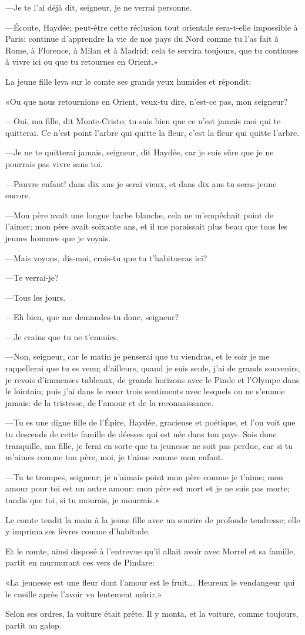 —Je te l'ai déjà dit, seigneur, je ne verrai personne. 

—Écoute, Haydée; peut-être cette réclusion tout orientale sera-t-elle impossible à Paris: continue d'apprendre la vie de nos pays du Nord comme tu l'as fait à Rome, à Florence, à Milan et à Madrid; cela te servira toujours, que tu continues à vivre ici ou que tu retournes en Orient.» 

La jeune fille leva sur le comte ses grands yeux humides et répondit: 

«Ou que nous retournions en Orient, veux-tu dire, n'est-ce pas, mon seigneur? 

—Oui, ma fille, dit Monte-Cristo; tu sais bien que ce n'est jamais moi qui te quitterai. Ce n'est point l'arbre qui quitte la fleur, c'est la fleur qui quitte l'arbre. 

—Je ne te quitterai jamais, seigneur, dit Haydée, car je suis sûre que je ne pourrais pas vivre sans toi. 

—Pauvre enfant! dans dix ans je serai vieux, et dans dix ans tu seras jeune encore. 

—Mon père avait une longue barbe blanche, cela ne m'empêchait point de l'aimer; mon père avait soixante ans, et il me paraissait plus beau que tous les jeunes hommes que je voyais. 

—Mais voyons, dis-moi, crois-tu que tu t'habitueras ici? 

—Te verrai-je? 

—Tous les jours. 

—Eh bien, que me demandes-tu donc, seigneur? 

—Je crains que tu ne t'ennuies. 

—Non, seigneur, car le matin je penserai que tu viendras, et le soir je me rappellerai que tu es venu; d'ailleurs, quand je suis seule, j'ai de grands souvenirs, je revois d'immenses tableaux, de grands horizons avec le Pinde et l'Olympe dans le lointain; puis j'ai dans le cœur trois sentiments avec lesquels on ne s'ennuie jamais: de la tristesse, de l'amour et de la reconnaissance. 

—Tu es une digne fille de l'Épire, Haydée, gracieuse et poétique, et l'on voit que tu descends de cette famille de déesses qui est née dans ton pays. Sois donc tranquille, ma fille, je ferai en sorte que ta jeunesse ne soit pas perdue, car si tu m'aimes comme ton père, moi, je t'aime comme mon enfant. 

—Tu te trompes, seigneur; je n'aimais point mon père comme je t'aime; mon amour pour toi est un autre amour: mon père est mort et je ne suis pas morte; tandis que toi, si tu mourais, je mourrais.»  

Le comte tendit la main à la jeune fille avec un sourire de profonde tendresse; elle y imprima ses lèvres comme d'habitude. 

Et le comte, ainsi disposé à l'entrevue qu'il allait avoir avec Morrel et sa famille, partit en murmurant ces vers de Pindare: 

«La jeunesse est une fleur dont l'amour est le fruit\dots. Heureux le vendangeur qui le cueille après l'avoir vu lentement mûrir.» 

Selon ses ordres, la voiture était prête. Il y monta, et la voiture, comme toujours, partit au galop. 